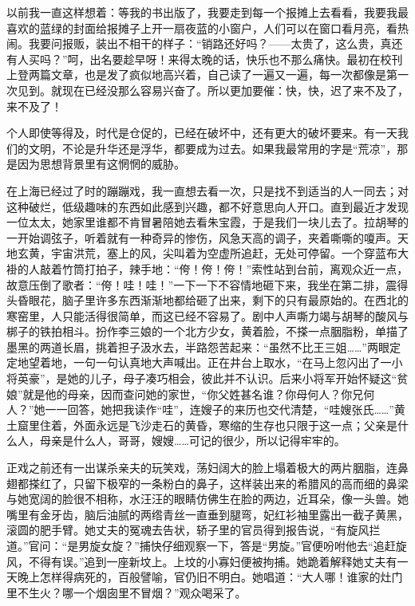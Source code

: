 \par 以前我一直这样想着：等我的书出版了，我要走到每一个报摊上去看看，我要我最喜欢的蓝绿的封面给报摊子上开一扇夜蓝的小窗户，人们可以在窗口看月亮，看热闹。我要问报贩，装出不相干的样子：“销路还好吗？——太贵了，这么贵，真还有人买吗？”呵，出名要趁早呀！来得太晚的话，快乐也不那么痛快。最初在校刊上登两篇文章，也是发了疯似地高兴着，自己读了一遍又一遍，每一次都像是第一次见到。就现在已经没那么容易兴奋了。所以更加要催：快，快，迟了来不及了，来不及了！
\par 个人即使等得及，时代是仓促的，已经在破坏中，还有更大的破坏要来。有一天我们的文明，不论是升华还是浮华，都要成为过去。如果我最常用的字是“荒凉”，那是因为思想背景里有这惘惘的威胁。
\par 在上海已经过了时的蹦蹦戏，我一直想去看一次，只是找不到适当的人一同去；对这种破烂，低级趣味的东西如此感到兴趣，都不好意思向人开口。直到最近才发现一位太太，她家里谁都不肯冒暑陪她去看朱宝霞，于是我们一块儿去了。拉胡琴的一开始调弦子，听着就有一种奇异的惨伤，风急天高的调子，夹着嘶嘶的嗄声。天地玄黄，宇宙洪荒，塞上的风，尖叫着为空虚所追赶，无处可停留。一个穿蓝布大褂的人敲着竹筒打拍子，辣手地：“侉！侉！侉！”索性站到台前，离观众近一点，故意压倒了歌者：“侉！哇！哇！”一下一下不容情地砸下来，我坐在第二排，震得头昏眼花，脑子里许多东西渐渐地都给砸了出来，剩下的只有最原始的。在西北的寒窑里，人只能活得很简单，而这已经不容易了。剧中人声嘶力竭与胡琴的酸风与梆子的铁拍相斗。扮作李三娘的一个北方少女，黄着脸，不搽一点胭脂粉，单描了墨黑的两道长眉，挑着担子汲水去，半路怨苦起来：“虽然不比王三姐……”两眼定定地望着地，一句一句认真地大声喊出。正在井台上取水，“在马上忽闪出了一小将英豪”，是她的儿子，母子凑巧相会，彼此并不认识。后来小将军开始怀疑这“贫娘”就是他的母亲，因而查问她的家世，“你父姓甚名谁？你母何人？你兄何人？”她一一回答，她把我读作“哇”，连嫂子的来历也交代清楚，“哇嫂张氏……”黄土窟里住着，外面永远是飞沙走石的黄昏，寒缩的生存也只限于这一点；父亲是什么人，母亲是什么人，哥哥，嫂嫂……可记的很少，所以记得牢牢的。
\par 正戏之前还有一出谋杀亲夫的玩笑戏，荡妇阔大的脸上塌着极大的两片胭脂，连鼻翅都搽红了，只留下极窄的一条粉白的鼻子，这样装出来的希腊风的高而细的鼻梁与她宽阔的脸很不相称，水汪汪的眼睛仿佛生在脸的两边，近耳朵，像一头兽。她嘴里有金牙齿，脑后油腻的两绺青丝一直垂到腿弯，妃红衫袖里露出一截子黄黑，滚圆的肥手臂。她丈夫的冤魂去告状，轿子里的官员得到报告说，“有旋风拦道。”官问：“是男旋女旋？”捕快仔细观察一下，答是“男旋。”官便吩咐他去“追赶旋风，不得有误。”追到一座新坟上。上坟的小寡妇便被拘捕。她跪着解释她丈夫有一天晚上怎样得病死的，百般譬喻，官仍旧不明白。她唱道：“大人哪！谁家的灶门里不生火？哪一个烟囱里不冒烟？”观众喝采了。
